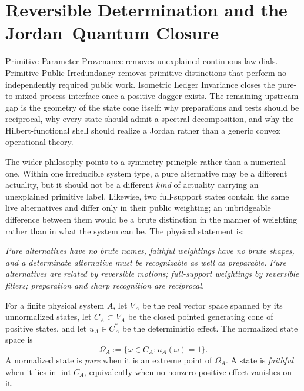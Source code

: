 
\section{Reversible Determination and the Jordan--Quantum Closure}
\label{sec:reversible-determination}

Primitive-Parameter Provenance removes unexplained continuous law dials.
Primitive Public Irredundancy removes primitive distinctions that perform no
independently required public work.  Isometric Ledger Invariance closes the
pure-to-mixed process interface once a positive dagger exists.  The remaining
upstream gap is the geometry of the state cone itself: why preparations and tests
should be reciprocal, why every state should admit a spectral decomposition, and
why the Hilbert-functional shell should realize a Jordan rather than a generic
convex operational theory.

The wider philosophy points to a symmetry principle rather than a numerical one.
Within one irreducible system type, a pure alternative may be a different actuality,
but it should not be a different \emph{kind} of actuality carrying an unexplained
primitive label.  Likewise, two full-support states contain the same live
alternatives and differ only in their public weighting; an unbridgeable difference
between them would be a brute distinction in the manner of weighting rather than in
what the system can be.  The physical statement is:
\begin{center}
\emph{Pure alternatives have no brute names, faithful weightings have no brute
shapes, and a determinate alternative must be recognizable as well as preparable.
Pure alternatives are related by reversible motions; full-support weightings by
reversible filters; preparation and sharp recognition are reciprocal.}
\end{center}

\begin{definition}
For a finite physical system $A$, let $V_A$ be the real vector space spanned by its
unnormalized states, let $C_A\subset V_A$ be the closed pointed generating cone of
positive states, and let $u_A\in C_A^*$ be the deterministic effect.  The normalized
state space is
\[
 \Omega_A:=\{\omega\in C_A:u_A(\omega)=1\}.
\]
A normalized state is \emph{pure} when it is an extreme point of $\Omega_A$.  A
state is \emph{faithful} when it lies in $\operatorname{int}C_A$, equivalently when
no nonzero positive effect vanishes on it.
\end{definition}

